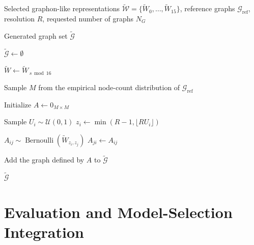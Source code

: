 \begin{algorithm}[H]
    \caption{Finite-graph sampling from selected graphon-like representations}
    \label{alg:graph_sampling}
    \begin{algorithmic}[1]
    
    \Require Selected graphon-like representations
             $\widetilde{\mathcal{W}}
             =
             \{\widetilde{W}_0,\ldots,\widetilde{W}_{15}\}$,
             reference graphs $\mathcal{G}_{\mathrm{ref}}$,
             resolution $R$,
             requested number of graphs $N_G$
    
    \Ensure Generated graph set $\widetilde{\mathcal{G}}$
    
    \State $\widetilde{\mathcal{G}} \gets \emptyset$
    
    
        \State $\widetilde{W}
               \gets
               \widetilde{W}_{\,s\bmod16}$
    
        \Repeat
            \State Sample $M$ from the empirical node-count
                   distribution of $\mathcal{G}_{\mathrm{ref}}$
    
        \State Initialize $A \gets 0_{M\times M}$
    
            \State Sample $U_i \sim \mathcal{U}(0,1)$
            \State $z_i
                   \gets
                   \min(R-1,\lfloor R U_i\rfloor)$
        \EndFor
    
            \State $A_{ij}
                   \sim
                   \operatorname{Bernoulli}
                   \left(
                   \widetilde{W}_{z_i,z_j}
                   \right)$
            \State $A_{ji} \gets A_{ij}$
        \EndFor
    
        \State Add the graph defined by $A$ to
               $\widetilde{\mathcal{G}}$
    
    \EndFor
    
    \State \Return $\widetilde{\mathcal{G}}$
    
    \end{algorithmic}
\end{algorithm}

\section{Evaluation and Model-Selection Integration}
\label{sec:method_ggme}

